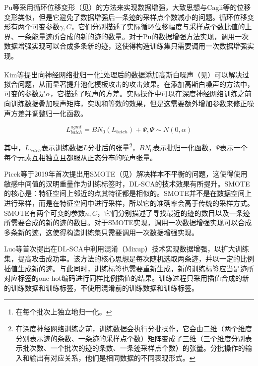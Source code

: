 {	Pu等\citep{Pu17}采用循环位移变形（见）的方法来实现数据增强，大致思想与Cagli等\citep{Cagli17}的位移变形类似，但是它避免了数据增强后一条迹的采样点个数减小的问题。循环位移变形有两个可变参数$\gamma,C$，它们分别描述了实际循环位移幅度与采样点个数比值的上界、一条能量迹所合成的新的迹的数量。对于Pu的数据增强方法实现，调用一次数据增强实现可以合成多条新的迹，这使得构造训练集只需要调用一次数据增强实现。
	
	Kim等\citep{Kim19}提出向神经网络批归一化\footnote{在每个批次上独立地归一化。}处理后的数据添加高斯白噪声（见）可以解决过拟合问题，从而显著提升池化模板攻击的攻击效果。在添加高斯白噪声的方法中，可变的参数是$\alpha$，它描述了噪声的方差。实际操作中可以在深度神经网络训练之前向训练数据叠加噪声矩阵，实现和等效的效果，但是这需要额外增加参数来修正噪声方差并调整归一化函数。
	
	\begin{equation}\label{eq:addnoise}
		 {L_{batch}^{agmt}}=BN_0(L_{batch})+\Psi,\Psi\sim N(0,\alpha)
	\end{equation}
	
	\noindent 其中，$L_{batch}$表示训练数据$L$分批后的张量\footnote{在深度神经网络训练之前，训练数据会执行分批操作，它会由二维（两个维度分别表示迹的条数、一条迹的采样点个数）矩阵变成了三维（三个维度分别表示批次数、一个批次的迹的条数、一条迹采样点个数）的张量。分批操作的输入和输出有对应关系，他们是相同数据的不同表现形式。}，$BN_0$表示批归一化函数，$\Psi$表示一个每个元素互相独立且都服从正态分布的噪声张量。
	
	Picek等\citep{Picek19}于2019年首次提出用SMOTE（见）解决样本不平衡的问题，这使得使用敏感中间值的汉明重量作为训练标签时，DL-SCA的技术效果有所提升。SMOTE的核心是：特征空间上邻近的点其特征都是相似的。SMOTE并不是在数据空间上进行采样，而是在特征空间中进行采样，所以它的准确率会高于传统的采样方式。SMOTE有两个可变的参数$n,C$，它们分别描述了寻找最近的迹的数目以及一条迹所需要合成的新的迹的数目。对于SMOTE实现，调用一次数据增强实现可以合成多条新的迹，这使得构造训练集只需要调用一次数据增强实现。
	
	Luo等\citep{Luo21}首次提出在DL-SCA中利用混淆（Mixup）技术实现数据增强，以扩大训练集，提高攻击成功率。该方法的核心思想是每次随机选取两条迹，并以一定的比例插值生成新的迹。与此同时，训练标签也需要重新生成，新的训练标签应当是迹所对应标签的one-hot编码进行同样比例插值的结果。训练过程只采用插值合成的新的训练数据和训练标签，不使用混淆前的训练数据和训练标签。
%	
}
